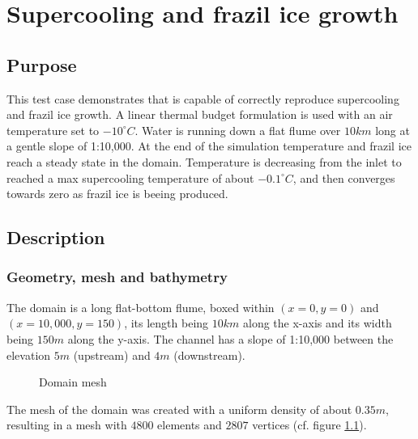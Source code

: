 \renewcommand{\labelitemi}{$\triangleright$}

\chapter{Supercooling and frazil ice growth}
%
%
\section{Purpose}
This test case demonstrates that \khione is capable of correctly reproduce
supercooling and frazil ice growth. 
A linear thermal budget formulation is used with an air temperature set to $-10^{\circ} C$. Water is running down a flat flume over $10km$ long at a gentle slope of 1:10,000. At the end of the simulation temperature and frazil ice reach a steady state in the domain. Temperature is decreasing from the inlet to reached a max supercooling temperature of about $-0.1^{\circ} C$, and then converges towards zero as frazil ice is beeing produced.

\section{Description}

\subsection{Geometry, mesh and bathymetry}
The domain is a long flat-bottom flume, boxed within $(x=0, y=0)$ and $(x=10,000, y=150)$, its length being $10km$ along the x-axis and its width being $150m$ along the y-axis. The channel has a slope of 1:10,000 between the elevation $5m$ (upstream) and $4m$ (downstream).

\begin{figure}[H]
    \begin{center}
    \end{center}
    \caption{Domain mesh}
    \label{fig:growth_mesh}
\end{figure}

The mesh of the domain was created with a uniform density of about $0.35m$, resulting in a mesh with $4800$ elements and $2807$ vertices (cf. figure \ref{fig:growth_mesh}).

